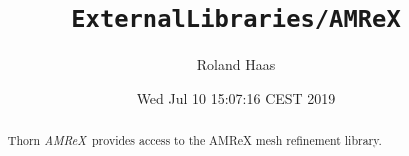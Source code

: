 \documentclass{article}
\begin{document}
\title{\tt ExternalLibraries/AMReX}
\author{Roland Haas}
\date{ Wed Jul 10 15:07:16 CEST 2019 }

\maketitle


\ifx\ThisThorn\undefined
\newcommand{\ThisThorn}{{\it AMReX}}
\else
\renewcommand{\ThisThorn}{{\it AMReX}}
\fi

\begin{abstract}
Thorn \ThisThorn\ provides access to the AMReX mesh refinement library.
\end{abstract}

\end{document}

